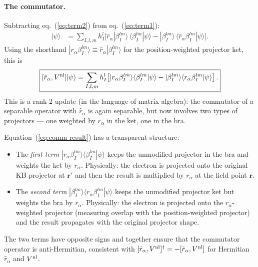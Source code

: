 \paragraph{The commutator.}
Subtracting eq.~(\ref{eq:term2}) from eq.~(\ref{eq:term1}):
\begin{align}
  [\hat{r}_\alpha,\Vnl]|\psi\rangle
  &= \sum_{I,l,m} h^l_I
     \Big[
     \hat{r}_\alpha|\beta^{lm}_I\rangle\,\langle\beta^{lm}_I|\psi\rangle
   - |\beta^{lm}_I\rangle\,\langle\hat{r}_\alpha\beta^{lm}_I|\psi\rangle
     \Big].
  \label{eq:comm-intermediate}
\end{align}
Using the shorthand $|r_\alpha\beta^{lm}_I\rangle \equiv
\hat{r}_\alpha|\beta^{lm}_I\rangle$ for the position-weighted
projector ket, this is
\begin{equation}
  \boxed{
  [\hat{r}_\alpha,V^{\mathrm{nl}}]|\psi\rangle
  = \sum_{I,l,m} h^l_I\!\left[
    |r_\alpha\beta^{lm}_I\rangle\langle\beta^{lm}_I|\psi\rangle
  - |\beta^{lm}_I\rangle\langle r_\alpha\beta^{lm}_I|\psi\rangle
    \right].
  }
  \label{eq:comm-result}
\end{equation}
This is a rank-2 update (in the language of matrix algebra): the
commutator of a separable operator with $\hat{r}_\alpha$ is
again separable, but now involves two types of projectors — one
weighted by $r_\alpha$ in the ket, one in the bra.

Equation~(\ref{eq:comm-result}) has a transparent structure:
\begin{itemize}
  \item The \emph{first term}
    $|r_\alpha\beta^{lm}_I\rangle\langle\beta^{lm}_I|\psi\rangle$
    keeps the unmodified projector in the bra and weights the ket
    by $r_\alpha$.
    Physically: the electron is projected onto the original KB
    projector at $\mathbf{r}'$ and then the result is multiplied
    by $r_\alpha$ at the field point $\mathbf{r}$.
  \item The \emph{second term}
    $|\beta^{lm}_I\rangle\langle r_\alpha\beta^{lm}_I|\psi\rangle$
    keeps the unmodified projector ket but weights the bra by
    $r_\alpha$.
    Physically: the electron is projected onto the
    $r_\alpha$-weighted projector (measuring overlap with the
    position-weighted projector) and the result propagates with
    the original projector shape.
\end{itemize}
The two terms have opposite signs and together ensure that the
commutator operator is anti-Hermitian, consistent with
$[\hat{r}_\alpha, V^{\mathrm{nl}}]^\dag = -[\hat{r}_\alpha, V^{\mathrm{nl}}]$ for
Hermitian $\hat{r}_\alpha$ and $V^{\mathrm{nl}}$.

